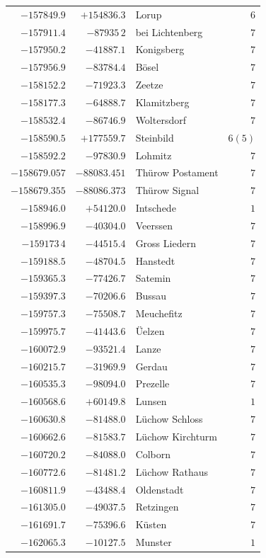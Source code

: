 \begin{center}
\begin{tabular}{r|r|p{170pt}|r}
\(-157849.9\)&\(+154836.3\)&Lorup&\(6\)\\
\(-157911.4\)&\(-87935\,2\)&bei Lichtenberg&\(7\)\\
\(-157950.2\)&\(-41887.1\)&Konigsberg&\(7\)\\
\(-157956.9\)&\(-83784.4\)&Bösel&\(7\)\\
\(-158152.2\)&\(-71923.3\)&Zeetze&\(7\)\\
\(-158177.3\)&\(-64888.7\)&Klamitzberg&\(7\)\\
\(-158532.4\)&\(-86746.9\)&Woltersdorf&\(7\)\\
\(-158590.5\)&\(+177559.7\)&Steinbild&\(6 (5)\)\\
\(-158592.2\)&\(-97830.9\)&Lohmitz&\(7\)\\
\(-158679.057\)&\(-88083.451\)&Thürow Postament&\(7\)\\
\(-158679.355\)&\(-88086.373\)&Thürow Signal&\(7\)\\
\(-158946.0\)&\(+54120.0\)&Intschede&\(1\)\\
\(-158996.9\)&\(-40304.0\)&Veerssen&\(7\)\\
\(-159173\,4\)&\(-44515.4\)&Gross Liedern&\(7\)\\
\(-159188.5\)&\(-48704.5\)&Hanstedt&\(7\)\\
\(-159365.3\)&\(-77426.7\)&Satemin&\(7\)\\
\(-159397.3\)&\(-70206.6\)&Bussau&\(7\)\\
\(-159757.3\)&\(-75508.7\)&Meuchefitz&\(7\)\\
\(-159975.7\)&\(-41443.6\)&Üelzen&\(7\)\\
\(-160072.9\)&\(-93521.4\)&Lanze&\(7\)\\
\(-160215.7\)&\(-31969.9\)&Gerdau&\(7\)\\
\(-160535.3\)&\(-98094.0\)&Prezelle&\(7\)\\
\(-160568.6\)&\(+60149.8\)&Lunsen&\(1\)\\
\(-160630.8\)&\(-81488.0\)&Lüchow Schloss&\(7\)\\
\(-160662.6\)&\(-81583.7\)&Lüchow Kirchturm&\(7\)\\
\(-160720.2\)&\(-84088.0\)&Colborn&\(7\)\\
\(-160772.6\)&\(-81481.2\)&Lüchow Rathaus&\(7\)\\
\(-160811.9\)&\(-43488.4\)&Oldenstadt&\(7\)\\
\(-161305.0\)&\(-49037.5\)&Retzingen&\(7\)\\
\(-161691.7\)&\(-75396.6\)&Küsten&\(7\)\\
\(-162065.3\)&\(-10127.5\)&Munster&\(1\)\\
\hline\end{tabular}\endgroup\end{center}
